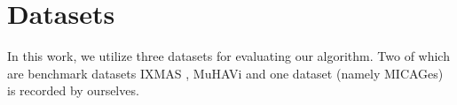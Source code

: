
\section{Datasets}

    In this work, we utilize three datasets for evaluating our algorithm. Two of which are benchmark datasets IXMAS \cite{weinland2006free}, MuHAVi \cite{murtaza2016multi} and one dataset (namely MICAGes) is recorded by ourselves. 

    
    
    
